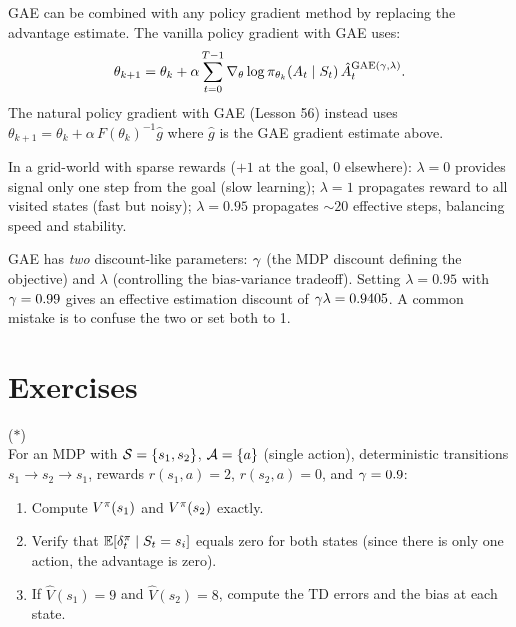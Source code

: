 \documentclass[11pt,a4paper]{article}
\begin{document}
GAE can be combined with any policy gradient method by replacing
the advantage estimate. The vanilla policy gradient with GAE uses:
\[
  \theta_{k+1} = \theta_k + \alpha \sum_{t=0}^{T-1}
  \nabla_\theta \log \pi_{\theta_k}(A_t \mid S_t)\,
  \hat{A}_t^{\mathrm{GAE}(\gamma,\lambda)}.
\]
The natural policy gradient with GAE (Lesson 56) instead uses
$\theta_{k+1} = \theta_k + \alpha\, F(\theta_k)^{-1} \hat{g}$
where $\hat{g}$ is the GAE gradient estimate above.

\begin{example}
\label{ex:lambda-effect}
In a grid-world with sparse rewards ($+1$ at the goal, $0$ elsewhere):
$\lambda = 0$ provides signal only one step from the goal (slow
learning); $\lambda = 1$ propagates reward to all visited states
(fast but noisy); $\lambda = 0.95$ propagates $\sim 20$ effective
steps, balancing speed and stability.
\end{example}

\begin{warning}[title={Two Discount Parameters in GAE}]
GAE has \emph{two} discount-like parameters: $\gamma$ (the MDP
discount defining the objective) and $\lambda$ (controlling the
bias-variance tradeoff). Setting $\lambda = 0.95$ with $\gamma =
0.99$ gives an effective estimation discount of $\gamma\lambda =
0.9405$. A common mistake is to confuse the two or set both to 1.
\end{warning}

\section{Exercises}

\begin{exercise}
\textnormal{(\(*\))} \\
  For an MDP with $\mathcal{S} = \{s_1, s_2\}$, $\mathcal{A} = \{a\}$
  (single action), deterministic transitions $s_1 \to s_2 \to s_1$,
  rewards $r(s_1, a) = 2$, $r(s_2, a) = 0$, and $\gamma = 0.9$:
  \begin{enumerate}[label=(\alph*)]
    \item Compute $V^{\pi}(s_1)$ and $V^{\pi}(s_2)$ exactly.
    \item Verify that $\mathbb{E}[\delta_t^\pi \mid S_t = s_i]$ equals zero
      for both states (since there is only one action, the advantage is
      zero).
    \item If $\hat{V}(s_1) = 9$ and $\hat{V}(s_2) = 8$, compute the
      TD errors and the bias at each state.
  \end{enumerate}
\end{exercise}
\end{document}
